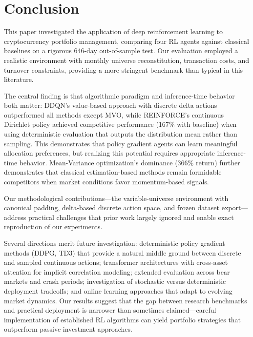 
\section{Conclusion}
\label{sec:conclusion}

This paper investigated the application of deep reinforcement learning to cryptocurrency portfolio management, comparing four RL agents against classical baselines on a rigorous 646-day out-of-sample test. Our evaluation employed a realistic environment with monthly universe reconstitution, transaction costs, and turnover constraints, providing a more stringent benchmark than typical in this literature.

The central finding is that algorithmic paradigm and inference-time behavior both matter: DDQN's value-based approach with discrete delta actions outperformed all methods except MVO, while REINFORCE's continuous Dirichlet policy achieved competitive performance (167\% with baseline) when using deterministic evaluation that outputs the distribution mean rather than sampling. This demonstrates that policy gradient agents can learn meaningful allocation preferences, but realizing this potential requires appropriate inference-time behavior. Mean-Variance optimization's dominance (366\% return) further demonstrates that classical estimation-based methods remain formidable competitors when market conditions favor momentum-based signals.

Our methodological contributions---the variable-universe environment with canonical padding, delta-based discrete action space, and frozen dataset export---address practical challenges that prior work largely ignored and enable exact reproduction of our experiments.

Several directions merit future investigation: deterministic policy gradient methods (DDPG, TD3) that provide a natural middle ground between discrete and sampled continuous actions; transformer architectures with cross-asset attention for implicit correlation modeling; extended evaluation across bear markets and crash periods; investigation of stochastic versus deterministic deployment tradeoffs; and online learning approaches that adapt to evolving market dynamics. Our results suggest that the gap between research benchmarks and practical deployment is narrower than sometimes claimed---careful implementation of established RL algorithms can yield portfolio strategies that outperform passive investment approaches.
